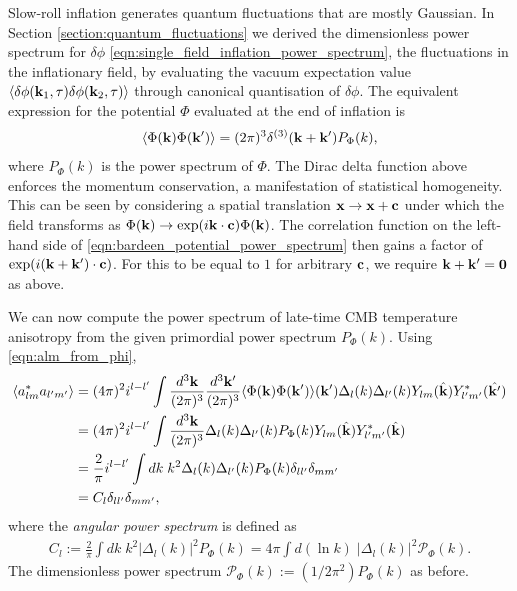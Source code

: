 Slow-roll inflation generates quantum fluctuations that are mostly Gaussian. In Section \ref{section:quantum_fluctuations} we derived the dimensionless power spectrum for $\delta\phi$ \eqref{eqn:single_field_inflation_power_spectrum}, the fluctuations in the inflationary field, by evaluating the vacuum expectation value $\langle \delta\phi(\mathbf{k}_1,\tau) \delta\phi(\mathbf{k}_2,\tau) \rangle$ through canonical quantisation of $\delta\phi$. The equivalent expression for the potential $\Phi$ evaluated at the end of inflation is
\begin{align}
	\langle \Phi (\mathbf{k}) \Phi (\mathbf{k}') \rangle = (2\pi)^3 \delta^{(3)} (\mathbf{k} + \mathbf{k}') P_\Phi (k), \label{eqn:bardeen_potential_power_spectrum}
\end{align}
where $P_\Phi (k)$ is the power spectrum of $\Phi$. The Dirac delta function above enforces the momentum conservation, a manifestation of statistical homogeneity. This can be seen by considering a spatial translation $\mathbf{x} \rightarrow \mathbf{x}+\mathbf{c}$ under which the field transforms as $\Phi(\mathbf{k}) \rightarrow \exp(i\mathbf{k}\cdot\mathbf{c}) \Phi(\mathbf{k})$. The correlation function on the left-hand side of \eqref{eqn:bardeen_potential_power_spectrum} then gains a factor of $\exp(i(\mathbf{k}+\mathbf{k}')\cdot\mathbf{c})$. For this to be equal to $1$ for arbitrary $\mathbf{c}$, we require $\mathbf{k}+\mathbf{k}'=\mathbf{0}$ as above.

We can now compute the power spectrum of late-time CMB temperature anisotropy from the given primordial power spectrum $P_\Phi(k)$. Using \eqref{eqn:alm_from_phi},
\begin{align}
	\langle a^*_{lm} a_{l'm'} \rangle &= (4\pi)^2 i^{l-l'} \int \frac{d^3\mathbf{k}}{(2\pi)^3} \frac{d^3\mathbf{k'}}{(2\pi)^3} \langle \Phi (\mathbf{k}) \Phi (\mathbf{k}') \rangle (\mathbf{k}') \Delta_l (k) \Delta_{l'} (k) Y_{lm}(\hat{\mathbf{k}}) Y^*_{l'm'}(\hat{\mathbf{k}'})  \\
	&= (4\pi)^2 i^{l-l'} \int \frac{d^3\mathbf{k}}{(2\pi)^3} \Delta_l (k) \Delta_{l'} (k) P_\Phi(k) Y_{lm}(\hat{\mathbf{k}}) Y^*_{l'm'}(\hat{\mathbf{k}}) \\
	&= \frac{2}{\pi} i^{l-l'} \int dk \; k^2  \Delta_l (k) \Delta_{l'} (k) P_\Phi (k) \delta_{ll'} \delta_{mm'} \\
	&= C_{l} \delta_{ll'} \delta_{mm'}, \label{eqn:angular_power_spectrum_form}
\end{align}
where the \textit{angular power spectrum} is defined as
\begin{align}
		C_l := \frac{2}{\pi} \int dk \; k^2 |\Delta_l(k)|^2 P_\Phi (k) = 4\pi \int d(\ln k) \; |\Delta_l(k)|^2 \mathcal{P}_\Phi (k).
\end{align}
The dimensionless power spectrum $\mathcal{P}_\Phi(k) := (1/2\pi^2) P_\Phi(k)$ as before.

